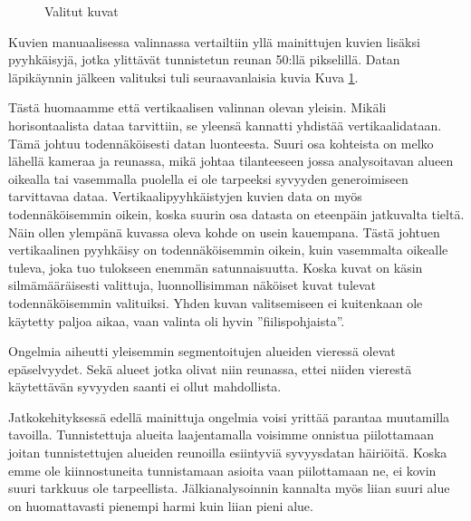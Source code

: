 \begin{figure}[h]
    \centering
    \caption{Valitut kuvat}
    \label{fig:selected}
    \end{figure}


Kuvien manuaalisessa valinnassa vertailtiin yllä mainittujen kuvien lisäksi pyyhkäisyjä,
jotka ylittävät tunnistetun reunan 50:llä pikselillä.
Datan läpikäynnin jälkeen valituksi tuli seuraavanlaisia kuvia Kuva \ref{fig:selected}.


Tästä huomaamme että vertikaalisen valinnan olevan yleisin.
Mikäli horisontaalista dataa tarvittiin, se yleensä kannatti yhdistää vertikaalidataan.
Tämä johtuu todennäköisesti datan luonteesta. Suuri osa kohteista on melko lähellä kameraa ja reunassa, 
mikä johtaa tilanteeseen jossa analysoitavan alueen oikealla tai vasemmalla puolella ei ole tarpeeksi syvyyden generoimiseen tarvittavaa dataa.
Vertikaalipyyhkäistyjen kuvien data on myös todennäköisemmin oikein, koska suurin osa datasta on eteenpäin jatkuvalta tieltä.
Näin ollen ylempänä kuvassa oleva kohde on usein kauempana.
Tästä johtuen vertikaalinen pyyhkäisy on todennäköisemmin oikein, kuin vasemmalta oikealle tuleva, joka tuo tulokseen enemmän satunnaisuutta.
Koska kuvat on käsin silmämääräisesti valittuja, luonnollisimman näköiset kuvat tulevat  todennäköisemmin valituiksi.
Yhden kuvan valitsemiseen ei kuitenkaan ole käytetty paljoa aikaa, vaan valinta oli hyvin ”fiilispohjaista”.

Ongelmia aiheutti yleisemmin segmentoitujen alueiden vieressä olevat epäselvyydet.
Sekä alueet jotka olivat niin reunassa, ettei niiden vierestä käytettävän syvyyden saanti ei ollut mahdollista.

Jatkokehityksessä edellä mainittuja ongelmia voisi yrittää parantaa muutamilla tavoilla. 
Tunnistettuja alueita laajentamalla voisimme onnistua piilottamaan joitan tunnistettujen alueiden reunoilla esiintyviä syvyysdatan häiriöitä.
Koska emme ole kiinnostuneita tunnistamaan asioita vaan piilottamaan ne, ei kovin suuri tarkkuus ole tarpeellista.
Jälkianalysoinnin kannalta myös liian suuri alue on huomattavasti pienempi harmi kuin liian pieni alue.

